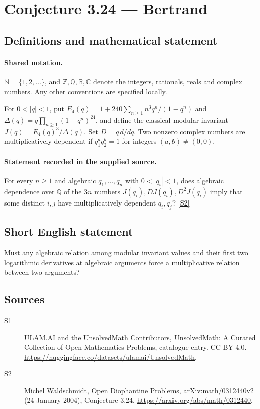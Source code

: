 \documentclass[11pt]{article}
\newcommand{\sref}[2]{\hyperlink{source:#1:#2}{[S#2]}}
\begin{document}
\section{Conjecture 3.24 — Bertrand}\label{statement}

\subsection{Definitions and mathematical statement}

\paragraph{Shared notation.}$\mathbb N=\{1,2,\ldots\}$, and $\mathbb Z,\mathbb Q,\mathbb R,\mathbb C$ denote the integers, rationals, reals and complex numbers. Any other conventions are specified locally.


For $0<|q|<1$, put $E_4(q)=1+240\sum_{n\ge1}n^3q^n/(1-q^n)$ and $\Delta(q)=q\prod_{n\ge1}(1-q^n)^{24}$, and define the classical modular invariant $J(q)=E_4(q)^3/\Delta(q)$. Set $D=q\,d/dq$. Two nonzero complex numbers are multiplicatively dependent if $q_1^a q_2^b=1$ for integers $(a,b)\ne(0,0)$.
\paragraph{Statement recorded in the supplied source.}
For every $n\ge1$ and algebraic $q_1,\ldots,q_n$ with $0<|q_i|<1$, does algebraic dependence over $\mathbb Q$ of the $3n$ numbers $J(q_i),DJ(q_i),D^2J(q_i)$ imply that some distinct $i,j$ have multiplicatively dependent $q_i,q_j$? \sref{statement}{2}
\subsection{Short English statement}
Must any algebraic relation among modular invariant values and their first two logarithmic derivatives at algebraic arguments force a multiplicative relation between two arguments?
\subsection{Sources}
\begin{description}
\item[\hypertarget{source:statement:1}{S1}] ULAM.AI and the UnsolvedMath Contributors, UnsolvedMath: A Curated Collection of Open Mathematics Problems, catalogue entry. CC BY 4.0. \url{https://huggingface.co/datasets/ulamai/UnsolvedMath}.
\item[\hypertarget{source:statement:2}{S2}] Michel Waldschmidt, Open Diophantine Problems, arXiv:math/0312440v2 (24 January 2004), Conjecture 3.24. \url{https://arxiv.org/abs/math/0312440}.
\end{description}
\label{end:statement}
\end{document}
